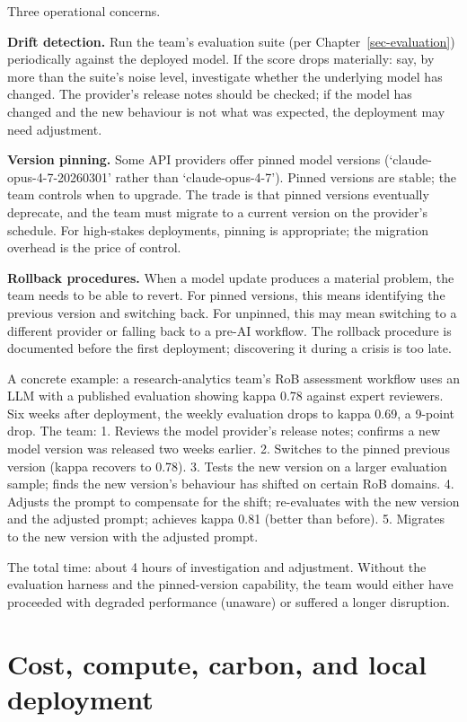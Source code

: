 \documentclass[
  letterpaper,
  11pt]{scrbook}
\begin{document}
Three operational concerns.

\textbf{Drift detection.} Run the team's evaluation suite (per
Chapter~\ref{sec-evaluation}) periodically against the deployed model.
If the score drops materially: say, by more than the suite's noise
level, investigate whether the underlying model has changed. The
provider's release notes should be checked; if the model has changed and
the new behaviour is not what was expected, the deployment may need
adjustment.

\textbf{Version pinning.} Some API providers offer pinned model versions
(`claude-opus-4-7-20260301' rather than `claude-opus-4-7'). Pinned
versions are stable; the team controls when to upgrade. The trade is
that pinned versions eventually deprecate, and the team must migrate to
a current version on the provider's schedule. For high-stakes
deployments, pinning is appropriate; the migration overhead is the price
of control.

\textbf{Rollback procedures.} When a model update produces a material
problem, the team needs to be able to revert. For pinned versions, this
means identifying the previous version and switching back. For unpinned,
this may mean switching to a different provider or falling back to a
pre-AI workflow. The rollback procedure is documented before the first
deployment; discovering it during a crisis is too late.

A concrete example: a research-analytics team's RoB assessment workflow
uses an LLM with a published evaluation showing kappa 0.78 against
expert reviewers. Six weeks after deployment, the weekly evaluation
drops to kappa 0.69, a 9-point drop. The team: 1. Reviews the model
provider's release notes; confirms a new model version was released two
weeks earlier. 2. Switches to the pinned previous version (kappa
recovers to 0.78). 3. Tests the new version on a larger evaluation
sample; finds the new version's behaviour has shifted on certain RoB
domains. 4. Adjusts the prompt to compensate for the shift; re-evaluates
with the new version and the adjusted prompt; achieves kappa 0.81
(better than before). 5. Migrates to the new version with the adjusted
prompt.

The total time: about 4 hours of investigation and adjustment. Without
the evaluation harness and the pinned-version capability, the team would
either have proceeded with degraded performance (unaware) or suffered a
longer disruption.

\section{Cost, compute, carbon, and local
deployment}\label{cost-compute-carbon-and-local-deployment}
\end{document}
